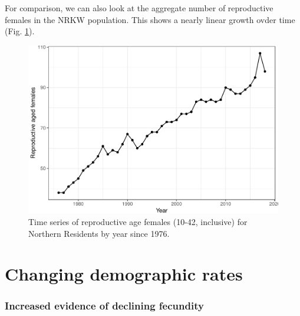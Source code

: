 \documentclass[]{article}
\begin{document}
For comparison, we can also look at the aggregate number of reproductive
females in the NRKW population. This shows a nearly linear growth ovder
time (Fig. \ref{fig:ts-reprofemales-nr}).

\begin{figure}
\centering
\includegraphics{status_update_files/figure-latex/reprots2-1.pdf}
\caption{Time series of reproductive age females (10-42, inclusive) for
Northern Residents by year since 1976. \label{fig:ts-reprofemales-nr}}
\end{figure}

\hypertarget{changing-demographic-rates}{%
\section{Changing demographic rates}\label{changing-demographic-rates}}

\hypertarget{increased-evidence-of-declining-fecundity}{%
\subsubsection{Increased evidence of declining
fecundity}\label{increased-evidence-of-declining-fecundity}}
\end{document}
